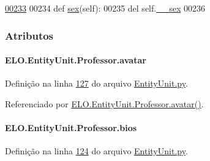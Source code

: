 \begin{DoxyCode}
\hypertarget{classELO_1_1EntityUnit_1_1Professor_l00233}{}\hyperlink{classELO_1_1EntityUnit_1_1Professor_a2244fa9a5f02a5845cc6c0686b2cf08a}{00233} 
00234     \textcolor{keyword}{def }\hyperlink{classELO_1_1EntityUnit_1_1Professor_ac049dc360c4af27037158e33577288e1}{sex}(self):
00235         del self.\hyperlink{classELO_1_1EntityUnit_1_1Professor_ad039f8756667f0f92ce17edf73a084fe}{\_\_sex}
00236 

\end{DoxyCode}


\subsubsection{Atributos}
\hypertarget{classELO_1_1EntityUnit_1_1Professor_a593a0636e87dcdd9ced2e6b7494a45dc}{
\paragraph[{avatar}]{\setlength{\rightskip}{0pt plus 5cm}E\-L\-O.\-Entity\-Unit.\-Professor.\-avatar}}\label{classELO_1_1EntityUnit_1_1Professor_a593a0636e87dcdd9ced2e6b7494a45dc}


Definição na linha \hyperlink{EntityUnit_8py_source_l00127}{127} do arquivo \hyperlink{EntityUnit_8py_source}{Entity\-Unit.\-py}.



Referenciado por \hyperlink{classELO_1_1EntityUnit_1_1Professor_a158f4ccf788610ba580639216b621c5b}{E\-L\-O.\-Entity\-Unit.\-Professor.\-avatar()}.

\hypertarget{classELO_1_1EntityUnit_1_1Professor_a2e403e0bfc353dcdf9988140d61d5ca7}{
\paragraph[{bios}]{\setlength{\rightskip}{0pt plus 5cm}E\-L\-O.\-Entity\-Unit.\-Professor.\-bios}}\label{classELO_1_1EntityUnit_1_1Professor_a2e403e0bfc353dcdf9988140d61d5ca7}


Definição na linha \hyperlink{EntityUnit_8py_source_l00124}{124} do arquivo \hyperlink{EntityUnit_8py_source}{Entity\-Unit.\-py}.



